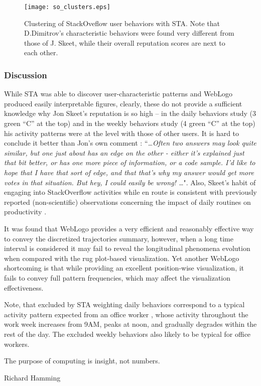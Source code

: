 \begin{figure}[t]
   \centering
   \texttt{[image: so\_clusters.eps]}
   \caption[Clustering of StackOveflow user behaviors with STA.]{Clustering of StackOveflow user behaviors with STA. Note that D.Dimitrov's characteristic behaviors were found very different from those of J. Skeet, while their overall reputation scores are next to each other.}
   \label{fig:stack_clusters}   
\end{figure}

\subsubsection{Discussion}
While STA was able to discover user-characteristic patterns and WebLogo produced easily interpretable figures, clearly, these do not provide a sufficient knowledge why Jon Skeet's reputation is so high -- in the daily behaviors study (3 green ``C'' at the top) and in the weekly behaviors study (4 green ``C'' at the top) his activity patterns were at the level with those of other users. It is hard to conclude it better than Jon's own comment \cite{skeet}: ``\textit{\dots Often two answers may look quite similar, but one just about has an edge on the other - either it's explained just that bit better, or has one more piece of information, or a code sample. I'd like to hope that I have that sort of edge, and that that's why my answer would get more votes in that situation. But hey, I could easily be wrong! \dots}". Also, Skeet's habit of engaging into StackOverflow activities while en route is consistent with previously reported (non-scientific) observations concerning the impact of daily routines on productivity \cite{tharp_habit}.

It was found that WebLogo provides a very efficient and reasonably effective way to convey the discretized trajectories summary, however, when a long time interval is considered it may fail to reveal the longitudinal phenomena evolution when compared with the rug plot-based visualization. Yet another WebLogo shortcoming is that while providing an excellent position-wise visualization, it fails to convey full pattern frequencies, which may affect the visualization effectiveness.

Note, that excluded by STA weighting daily behaviors correspond to a typical activity pattern expected from an office worker \cite{activity_patterns}, whose activity throughout the work week increases from 9AM, peaks at noon, and gradually degrades within the rest of the day. The excluded weekly behaviors also likely to be typical for office workers.


\epigraph{The purpose of computing is insight, not numbers.}{Richard Hamming}
